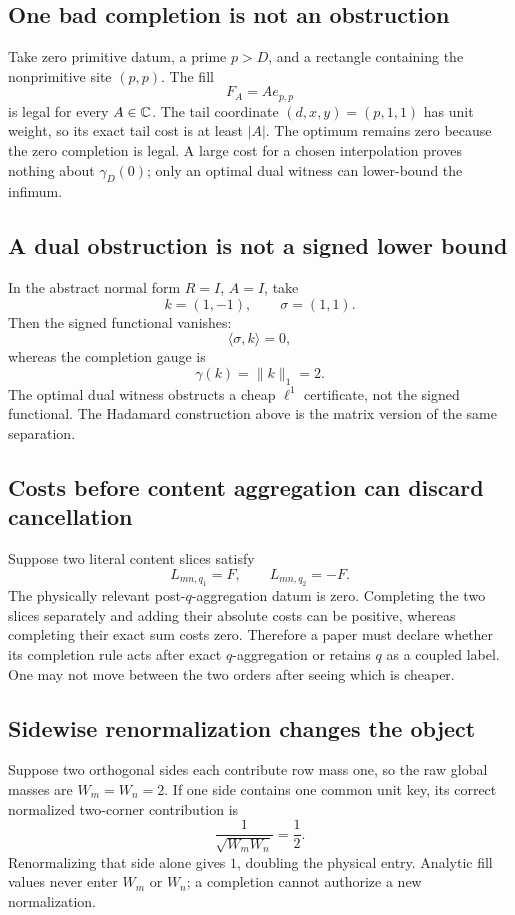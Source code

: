 \subsection{One bad completion is not an obstruction}

Take zero primitive datum, a prime \(p>D\), and a rectangle containing
the nonprimitive site \((p,p)\).  The fill
\[
 F_A=Ae_{p,p}
\]
is legal for every \(A\in\mathbb C\).  The tail coordinate
\((d,x,y)=(p,1,1)\) has unit weight, so its exact tail cost is at least
\(|A|\).  The optimum remains zero because the zero completion is legal.
A large cost for a chosen interpolation proves nothing about
\(\gamma_D(0)\); only an optimal dual witness can lower-bound the
infimum.

\subsection{A dual obstruction is not a signed lower bound}

In the abstract normal form \(R=I\), \(A=I\), take
\[
 k=(1,-1),
 \qquad
 \sigma=(1,1).
\]
Then the signed functional vanishes:
\[
 \langle\sigma,k\rangle=0,
\]
whereas the completion gauge is
\[
 \gamma(k)=\|k\|_1=2.
\]
The optimal dual witness obstructs a cheap \(\ell^1\) certificate, not
the signed functional.  The Hadamard construction above is the matrix
version of the same separation.

\subsection{Costs before content aggregation can discard cancellation}

Suppose two literal content slices satisfy
\[
 L_{mn,q_1}=F,
 \qquad
 L_{mn,q_2}=-F.
\]
The physically relevant post-\(q\)-aggregation datum is zero.  Completing
the two slices separately and adding their absolute costs can be
positive, whereas completing their exact sum costs zero.  Therefore a
paper must declare whether its completion rule acts after exact
\(q\)-aggregation or retains \(q\) as a coupled label.  One may not move
between the two orders after seeing which is cheaper.

\subsection{Sidewise renormalization changes the object}

Suppose two orthogonal sides each contribute row mass one, so the raw
global masses are \(W_m=W_n=2\).  If one side contains one common unit
key, its correct normalized two-corner contribution is
\[
 \frac1{\sqrt{W_mW_n}}=\frac12.
\]
Renormalizing that side alone gives \(1\), doubling the physical entry.
Analytic fill values never enter \(W_m\) or \(W_n\); a completion cannot
authorize a new normalization.

